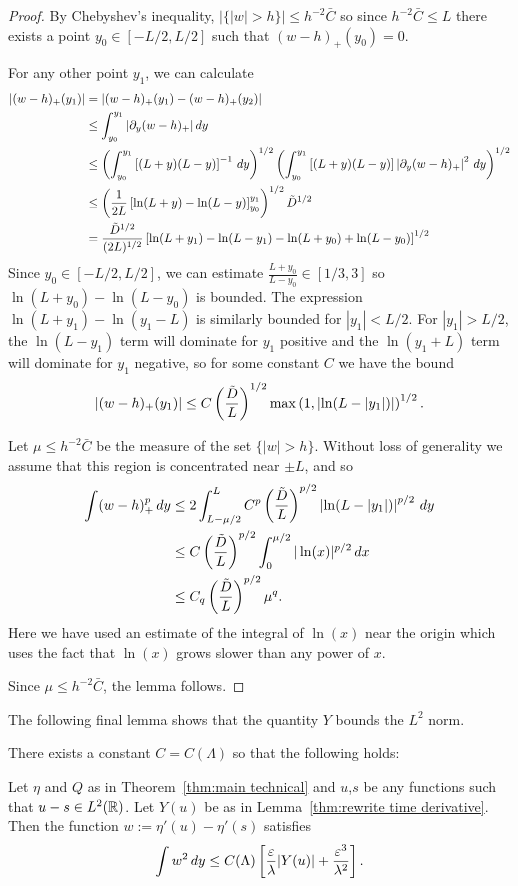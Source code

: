 \begin{proof}
By Chebyshev's inequality, $|\{|w|>h\}| \leq h^{-2} \bar{C}$ so since $h^{-2} \bar{C} \leq L$ there exists a point $y_0 \in [-L/2,L/2]$ such that $(w-h)_+(y_0) = 0$.  

For any other point $y_1$, we can calculate
\begin{align*}
|(w-h)_+(y_1)| &= |(w-h)_+(y_1) - (w-h)_+(y_2)| 
\\ &\leq \int_{y_0}^{y_1} |\partial_y (w-h)_+| \,dy
\\ &\leq \left( \int_{y_0}^{y_1} \left[ (L+y)(L-y) \right]^{-1} \,dy \right)^{1/2} \left( \int_{y_0}^{y_1} \left[ (L+y)(L-y) \right] \left\lvert \partial_y (w-h)_+ \right\rvert^2 \,dy \right)^{1/2}
\\ &\leq \left(  \frac{1}{2L} \left[ \ln(L+y) - \ln(L-y) \right]_{y_0}^{y_1}  \right)^{1/2} \tilde{D}^{1/2}
\\ &= \frac{\tilde{D}^{1/2}}{(2L)^{1/2}} \left[ \ln(L+y_1) - \ln(L-y_1) - \ln(L+y_0) + \ln(L-y_0) \right]^{1/2}
\end{align*}
Since $y_0 \in [-L/2,L/2]$, we can estimate $\frac{L+y_0}{L-y_0} \in [1/3,3]$ so $\ln(L+y_0) - \ln(L-y_0)$ is bounded.  The expression $\ln(L+y_1) - \ln(y_1-L)$ is similarly bounded for $|y_1|<L/2$.  For $|y_1| > L/2$, the $\ln(L-y_1)$ term will dominate for $y_1$ positive and the $\ln(y_1+L)$ term will dominate for $y_1$ negative, so for some constant $C$ we have the bound
\[ |(w-h)_+(y_1)| \leq C \left( \frac{\tilde{D}}{L} \right)^{1/2} \max\left( 1,\left\lvert \ln(L-|y_1|) \right\rvert \right)^{1/2}. \]

Let $\mu \leq h^{-2}\bar{C}$ be the measure of the set $\{|w|>h\}$.  Without loss of generality we assume that this region is concentrated near $\pm L$, and so 
\begin{align*}
\int (w-h)_+^p \,dy &\leq 2 \int_{L-\mu/2}^L C^p \left( \frac{\tilde{D}}{L} \right)^{p/2} \left\lvert \ln(L-|y_1|) \right\rvert^{p/2} \,dy
\\ &\leq C \left( \frac{\tilde{D}}{L} \right)^{p/2} \int_0^{\mu/2} |\ln(x)|^{p/2} \,dx
\\ &\leq C_q \left( \frac{\tilde{D}}{L} \right)^{p/2} \mu^q.
\end{align*}
Here we have used an estimate of the integral of $\ln(x)$ near the origin which uses the fact that $\ln(x)$ grows slower than any power of $x$.  

Since $\mu \leq h^{-2}\bar{C}$, the lemma follows.  
\end{proof}

The following final lemma shows that the quantity $Y$ bounds the $L^2$ norm.  
\begin{lemma}\label{thm:Y bounds L2}
There exists a constant $C = C(\Lambda)$ so that the following holds:

Let $\eta$ and $Q$ as in Theorem~\ref{thm:main technical} and $u$,$s$ be any functions such that $u-s \in L^2(\mathbb{R})$.  Let $Y(u)$ be as in Lemma~\ref{thm:rewrite time derivative}. Then the function $w := \eta'(u)-\eta'(s)$ satisfies
\[ \int w^2 \,dy \leq C(\Lambda) \left[ \frac{\varepsilon}{\lambda} |Y(u)| + \frac{\varepsilon^3}{\lambda^2} \right]. \]
\end{lemma}

